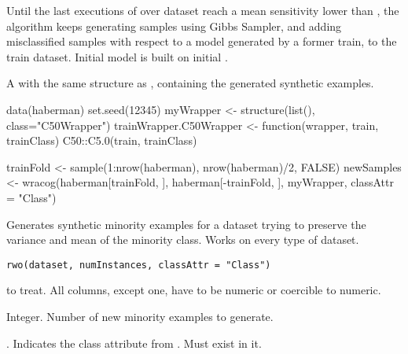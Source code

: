 %
\begin{Details}\relax
Until the last  executions of  over
 dataset reach a mean sensitivity lower than
, the algorithm keeps generating samples using Gibbs Sampler,
and adding misclassified samples with respect to a model generated by a
former train, to the train dataset. Initial model is built on initial
.
\end{Details}
%
\begin{Value}
A  with the same structure as ,
containing the generated synthetic examples.
\end{Value}
%
%
\begin{Examples}
\begin{ExampleCode}
data(haberman)
set.seed(12345)
myWrapper <- structure(list(), class="C50Wrapper")
trainWrapper.C50Wrapper <- function(wrapper, train, trainClass){
  C50::C5.0(train, trainClass)
}

trainFold <- sample(1:nrow(haberman), nrow(haberman)/2, FALSE)
newSamples <- wracog(haberman[trainFold, ], 
                     haberman[-trainFold, ],
                     myWrapper, classAttr = "Class")

\end{ExampleCode}
\end{Examples}
%
\begin{Description}\relax
Generates synthetic minority examples for a dataset trying to preserve the
variance and mean of the minority class. Works on every type of dataset.
\end{Description}
%
\begin{Usage}
\begin{verbatim}
rwo(dataset, numInstances, classAttr = "Class")
\end{verbatim}
\end{Usage}
%
\begin{Arguments}
\begin{ldescription}
\item[\code{dataset}]  to treat. All columns, except
 one, have to be numeric or coercible to numeric.

\item[\code{numInstances}] Integer. Number of new minority examples to generate.

\item[\code{classAttr}] . Indicates the class attribute from
. Must exist in it.
\end{ldescription}
\end{Arguments}
